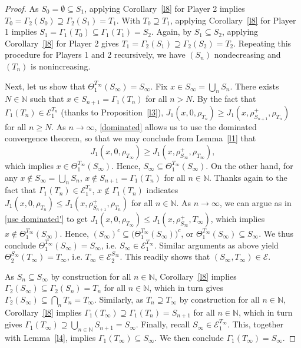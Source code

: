 \documentclass[11pt,reqno]{article}
\numberwithin{equation}{section}
\newcommand{\lemref}{Lemma~\ref}
\newcommand{\cE}{\mathcal{E}}
\newcommand{\N}{\mathbb{N}}
\begin{document}
\begin{proof}
As $S_0=\emptyset\subseteq S_1$, applying Corollary~\ref{l8} for Player 2 implies $T_0=\Gamma_2(S_0)\supseteq \Gamma_2(S_1)= T_1$. With $T_0\supseteq T_1$, applying Corollary~\ref{l8} for Player 1 implies $S_1=\Gamma_1(T_0)\subseteq \Gamma_1(T_1)= S_2$. Again, by $S_1\subseteq S_2$, applying Corollary~\ref{l8} for Player 2 gives $T_1=\Gamma_2(S_1)\supseteq \Gamma_2(S_2)= T_2$. Repeating this procedure for Players 1 and 2 recursively, we have $(S_n)$ nondecreasing and $(T_n)$ is nonincreasing.

Next, let us show that $\Theta_1^{T_\infty}(S_\infty)=S_\infty$. 
Fix $x\in S_\infty= \bigcup_n S_n$. There exists $N\in\N$ such that $x\in S_{n+1}=\Gamma_1(T_n)$ for all $n>N$. By the fact that $\Gamma_1(T_n) \in \cE_1^{T_n}$ (thanks to Proposition~\ref{l3}), $J_1(x,0,\rho_{T_n})\geq J_1(x,\rho^+_{S_{n+1}},\rho_{T_n})$ for all $n\ge N$. As $n\to\infty$, \eqref{dominated} allows us to use the dominated convergence theorem, so that we may conclude from \lemref{l1} that
\begin{equation}\label{use dominated'}
J_1(x,0,\rho_{T_\infty})\geq J_1(x,\rho^+_{S_\infty},\rho_{T_\infty}),
\end{equation}
which implies $x\in \Theta_1^{T_\infty}(S_\infty)$. Hence, $S_\infty\subseteq \Theta_1^{T_\infty}(S_\infty)$. On the other hand, for any $x\notin S_\infty = \bigcup_n S_n$, $x\notin S_{n+1}=\Gamma_1(T_n)$ for all $n\in\N$. Thanks again to the fact that $\Gamma_1(T_n) \in \cE_1^{T_n}$, $x\notin \Gamma_1(T_n)$ indicates
$J_1(x,0,\rho_{T_n})\leq J_1(x,\rho^+_{S_{n+1}},\rho_{T_n})$ for all $n\in\N$. As $n\to\infty$, we can argue as in \eqref{use dominated'} to get $J_1(x,0,\rho_{T_\infty})\leq J_1(x,\rho^+_{S_\infty},T_\infty)$, which implies $x\notin \Theta_1^{T_\infty}(S_\infty)$. Hence, $(S_\infty)^c\subseteq \big(\Theta_1^{T_\infty}(S_\infty)\big)^c$, or $\Theta_1^{T_\infty}(S_\infty)\subseteq S_\infty$. We thus conclude $\Theta_1^{T_\infty}(S_\infty)=S_\infty$, i.e. $S_\infty\in \cE_1^{T_\infty}$. Similar arguments as above yield $\Theta_2^{S_\infty}(T_\infty)=T_\infty$, i.e. $T_\infty\in \cE_2^{S_\infty}$. This readily shows that $(S_\infty,T_\infty)\in\cE$. 

As $S_n\subseteq S_\infty$ by construction for all $n\in\N$, Corollary~\ref{l8} implies $\Gamma_2(S_\infty)\subseteq \Gamma_2(S_n)=T_n$ for all $n\in\N$, which in turn gives $\Gamma_2(S_\infty)\subseteq \bigcap_n T_n=T_\infty$. Similarly, as $T_n \supseteq T_\infty$ by construction for all $n\in\N$, Corollary~\ref{l8} implies $\Gamma_1(T_\infty)\supseteq \Gamma_1(T_n)=S_{n+1}$ for all $n\in\N$, which in turn gives $\Gamma_1(T_\infty)\supseteq \bigcup_{n\in\N} S_{n+1}=S_\infty$. Finally, recall $S_\infty\in \cE_1^{T_\infty}$. This, together with Lemma~\ref{l4}, implies $\Gamma_1(T_\infty)\subseteq S_\infty$. We then conclude $\Gamma_1(T_\infty)= S_\infty$. 
\end{proof} 
\end{document}
